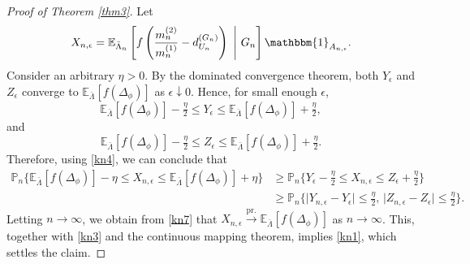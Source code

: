 \documentclass[11pt]{article}
\numberwithin{equation}{section}
\theoremstyle{plain}
\newcommand{\prob}{\overset{\mathrm{pr.}}{\longrightarrow}}
\newcommand{\E}{\mathbb E}
\renewcommand{\P}{\mathbb P}
\newcommand{\dn}{d^{(G_{n})}}
\begin{document}
\begin{proof}[Proof of Theorem \ref{thm3}]
Let
\begin{align*}
X_{n,\epsilon} = \E_{\bar{\Lambda}_{n}}\left[f\left(\frac{m_{n}^{(2)}}{m_{n}^{(1)}}-\dn_{U_n}\right) ~\Bigg|~ G_{n}\right]
\mathbbm{1}_{A_{n,\epsilon}}.
\end{align*}
Consider an arbitrary $\eta>0$. By the dominated convergence theorem, both $Y_{\epsilon}$ and $Z_{\epsilon}$ converge to $\E_{\bar{\Lambda}}[f(\Delta_{\phi})]$ as $\epsilon\downarrow 0$. Hence, for small enough $\epsilon$, 
\[
\E_{\bar{\Lambda}}[f(\Delta_{\phi})]-\tfrac{\eta}{2}\leq Y_{\epsilon}\leq \E_{\bar{\Lambda}}[f(\Delta_{\phi})]
+ \tfrac{\eta}{2},
\] 
and 
\[
\E_{\bar{\Lambda}}[f(\Delta_{\phi})]-\tfrac{\eta}{2}\leq Z_{\epsilon}\leq\E_{\bar{\Lambda}}[f(\Delta_{\phi})]
+ \tfrac{\eta}{2}.
\] 
Therefore, using \eqref{kn4}, we can conclude that
\begin{align*}
\P_{n}\Big\{\E_{\bar{\Lambda}}[f(\Delta_{\phi})]-\eta\leq X_{n,\epsilon}
\leq \E_{\bar{\Lambda}}[f(\Delta_{\phi})] +\eta\Big\}
&\geq \P_{n}\Big\{Y_{\epsilon} - \tfrac{\eta}{2}\leq X_{n,\epsilon}\leq Z_{\epsilon} + \tfrac{\eta}{2}\Big\}\\
&\geq \P_{n}\Big\{\big| Y_{n,\epsilon}-Y_{\epsilon}\big |\leq \tfrac{\eta}{2},\,\big| Z_{n,\epsilon}-Z_{\epsilon}\big|
\leq \tfrac{\eta}{2}\Big\}.
\end{align*}
Letting $n\to\infty$, we obtain from \eqref{kn7} that $X_{n,\epsilon}\prob \E_{\bar{\Lambda}}[f(\Delta_{\phi})]$ as $n\to\infty$. This, together with \eqref{kn3} and the continuous mapping theorem, implies \eqref{kn1}, which settles the claim. 
\end{proof}
\end{document}

